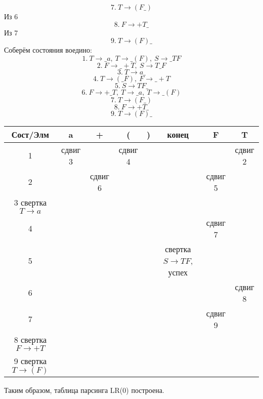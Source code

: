 \documentclass{article}
\begin{document}
$$7. \ T\to (F\_)$$
Из 6
$$8. \ F\to +T\_$$
Из 7
$$9.\ T\to (F)\_$$
Соберём состояния воедино:
$$1. \ T\to \_a, \ T\to \_(F), \ S\to \_TF$$
$$2. \ F\to \_+T, \ S\to T\_F $$
$$3. \ T\to a\_$$
$$4. \ T\to (\_F), \ F\to \_+T$$
$$5. \ S\to TF\_$$
$$6. \ F\to +\_T, \ T\to \_a, \ T\to \_(F)$$
$$7. \ T\to (F\_)$$
$$8. \ F\to +T\_$$
$$9.\ T\to (F)\_$$
\begin{center}
  \begin{tabular}{ c|c | c|c|c|c|c|c }
    Сост/Элм & a & + & ( & ) & конец & F & T \\
    \hline
    1    & сдвиг 3 &  & сдвиг 4  &   & &  & сдвиг 2 \\
    \hline
    2    &  & сдвиг 6 &  &   &  & сдвиг 5 & \\
    \hline
    3    свертка $T\to a$ \\
    \hline
    4    & &  &  &   &  & сдвиг 7 &  \\
    \hline
    5   & & & & & свертка $S\to TF$, успех &  \\
    \hline
    6    & &  &   &   &  & & сдвиг 8\\ 
    \hline
    7    & &  &  &   & & сдвиг 9  & \\
    \hline
    8   свертка $F\to +T$  \\
    \hline
    9  свертка $T\to (F)$    \\  
  \end{tabular}
\end{center}
Таким образом, таблица парсинга LR(0) построена. 
\end{document}
